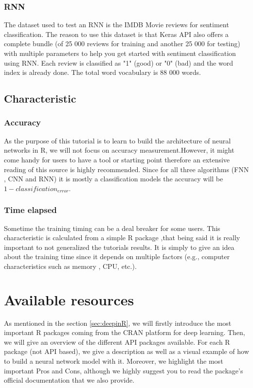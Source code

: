 \documentclass[letter,8pt]{article}\usepackage[]{graphicx}\usepackage[]{color}
\begin{document}
\subsubsection{RNN}
The dataset used to test an RNN is the IMDB Movie reviews for sentiment classification. The reason to use this dataset is that Keras API also offers a complete bundle (of 25 000 reviews for training and another 25 000 for testing) with multiple parameters to help you get started with sentiment classification using RNN. Each review is classified as "1" (good) or "0" (bad) and the word index is already done. The total word vocabulary is 88 000 words.



\subsection{Characteristic}
\subsubsection{Accuracy}
As the purpose of this tutorial is to learn to build the architecture of neural networks in R, we will not focus on accuracy measurement.However, it might come handy for users to have a tool or starting point therefore an extensive reading of this source \cite{perfomancelink} is highly recommended.
Since for all three algorithms (FNN , CNN and RNN) it is mostly a classification models the accuracy will be $1-classification_{error}$.
\subsubsection{Time elapsed}
Sometime the training timing can be a deal breaker for some users. This characteristic is calculated from a simple R package ,that being said it is really important to not generalized the tutorials results. It is simply to give an idea about the training time since it depends on multiple factors (e.g., computer characteristics such as memory , CPU, etc.).





\section{Available resources}
\label{sec:avail_ressour}
As mentioned in the section \ref{sec:deepinR}, we will firstly introduce the most important R packages coming from the CRAN platform for deep learning. Then, we will give an overview of the different API packages available. For each R package (not API based), we give a description as well as a visual example of how to build a neural network model with it. Moreover, we highlight the most important Pros and Cons, although we highly suggest you to read the package's official documentation that we also provide.
\end{document}
